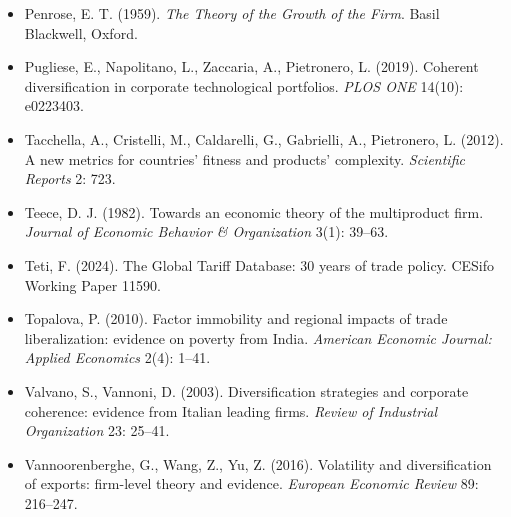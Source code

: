 \documentclass[11pt]{article}
\begin{document}
\begin{itemize}[leftmargin=1.4em,labelsep=0.4em]
  \item Penrose, E. T. (1959). \emph{The Theory of the Growth of the Firm}. Basil Blackwell, Oxford.
  \item Pugliese, E., Napolitano, L., Zaccaria, A., Pietronero, L. (2019). Coherent diversification in corporate technological portfolios. \emph{PLOS ONE} 14(10): e0223403.
  \item Tacchella, A., Cristelli, M., Caldarelli, G., Gabrielli, A., Pietronero, L. (2012). A new metrics for countries' fitness and products' complexity. \emph{Scientific Reports} 2: 723.
  \item Teece, D. J. (1982). Towards an economic theory of the multiproduct firm. \emph{Journal of Economic Behavior \& Organization} 3(1): 39--63.
  \item Teti, F. (2024). The Global Tariff Database: 30 years of trade policy. CESifo Working Paper 11590.
  \item Topalova, P. (2010). Factor immobility and regional impacts of trade liberalization: evidence on poverty from India. \emph{American Economic Journal: Applied Economics} 2(4): 1--41.
  \item Valvano, S., Vannoni, D. (2003). Diversification strategies and corporate coherence: evidence from Italian leading firms. \emph{Review of Industrial Organization} 23: 25--41.
  \item Vannoorenberghe, G., Wang, Z., Yu, Z. (2016). Volatility and diversification of exports: firm-level theory and evidence. \emph{European Economic Review} 89: 216--247.
\end{itemize}
\end{document}
